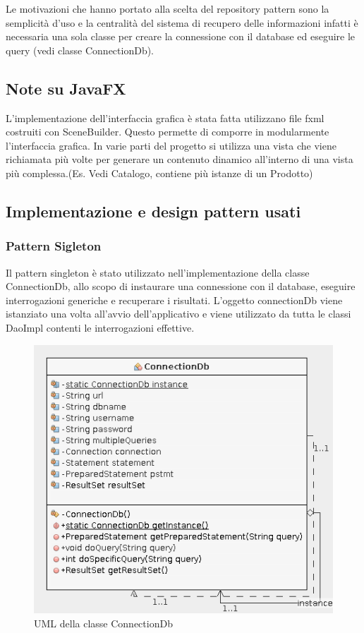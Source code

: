 \documentclass{article}
\begin{document}
Le motivazioni che hanno portato alla scelta del repository pattern sono la semplicità d'uso e la centralità del sistema di recupero delle informazioni infatti è necessaria una sola classe per creare la connessione con il database ed eseguire le query (vedi classe ConnectionDb).
\subsection{Note su JavaFX}
L'implementazione dell'interfaccia grafica è stata fatta utilizzano file fxml costruiti con SceneBuilder.
Questo permette di comporre in modularmente l'interfaccia grafica.
In varie parti del progetto si utilizza una vista che viene richiamata più volte per generare un contenuto
dinamico all'interno di una vista più complessa.(Es. Vedi Catalogo, contiene più istanze di un Prodotto)
\subsection{Implementazione e design pattern usati}
\subsubsection{Pattern Sigleton}
Il pattern singleton è stato utilizzato nell'implementazione della classe ConnectionDb, allo scopo di
instaurare una connessione con il database, eseguire interrogazioni generiche e recuperare i risultati.
L'oggetto connectionDb viene istanziato una volta all'avvio dell'applicativo e viene utilizzato
da tutta le classi DaoImpl contenti le interrogazioni effettive.
\begin{figure}[h!]
	\centering
	\includegraphics[width=\textwidth]{UmlConnectionDb.png}
	\caption{UML della classe ConnectionDb}
	\label{fig:UmlProdotto}
\end{figure}
\newpage
\end{document}
